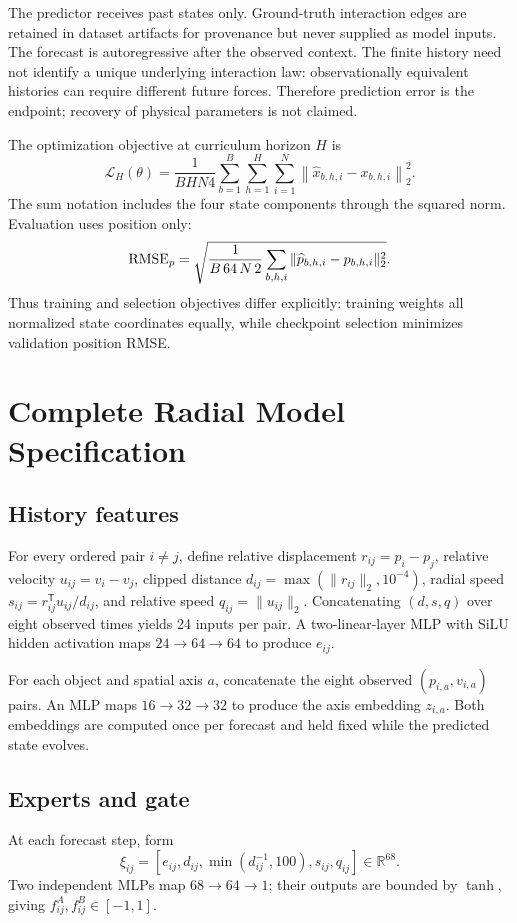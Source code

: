 \documentclass[10pt]{article}
\begin{document}
The predictor receives past states only. Ground-truth interaction edges are retained in dataset artifacts for provenance but never supplied as model inputs. The forecast is autoregressive after the observed context. The finite history need not identify a unique underlying interaction law: observationally equivalent histories can require different future forces. Therefore prediction error is the endpoint; recovery of physical parameters is not claimed.

The optimization objective at curriculum horizon $H$ is
\begin{equation}
 \mathcal{L}_H(\theta)=
 \frac{1}{BH N4}\sum_{b=1}^{B}\sum_{h=1}^{H}\sum_{i=1}^{N}
 \left\|\widehat{x}_{b,h,i}-x_{b,h,i}\right\|_2^2.
\end{equation}
The sum notation includes the four state components through the squared norm. Evaluation uses position only:
\begin{equation}
 {\rm RMSE}_p=
 \sqrt{\frac{1}{B\,64\,N\,2}
 \sum_{b,h,i}\|\widehat{p}_{b,h,i}-p_{b,h,i}\|_2^2}.
\end{equation}
Thus training and selection objectives differ explicitly: training weights all normalized state coordinates equally, while checkpoint selection minimizes validation position RMSE.

\section{Complete Radial Model Specification}
\subsection{History features}
For every ordered pair $i\ne j$, define relative displacement $r_{ij}=p_i-p_j$, relative velocity $u_{ij}=v_i-v_j$, clipped distance
$d_{ij}=\max(\|r_{ij}\|_2,10^{-4})$, radial speed
$s_{ij}=r_{ij}^{\mathsf T}u_{ij}/d_{ij}$, and relative speed
$q_{ij}=\|u_{ij}\|_2$. Concatenating $(d,s,q)$ over eight observed times yields 24 inputs per pair. A two-linear-layer MLP with SiLU hidden activation maps $24\to64\to64$ to produce $e_{ij}$.

For each object and spatial axis $a$, concatenate the eight observed $(p_{i,a},v_{i,a})$ pairs. An MLP maps $16\to32\to32$ to produce the axis embedding $z_{i,a}$. Both embeddings are computed once per forecast and held fixed while the predicted state evolves.

\subsection{Experts and gate}
At each forecast step, form
\begin{equation}
 \xi_{ij}=[e_{ij},d_{ij},\min(d_{ij}^{-1},100),s_{ij},q_{ij}]\in\mathbb{R}^{68}.
\end{equation}
Two independent MLPs map $68\to64\to1$; their outputs are bounded by $\tanh$, giving $f^A_{ij},f^B_{ij}\in[-1,1]$.
\end{document}
